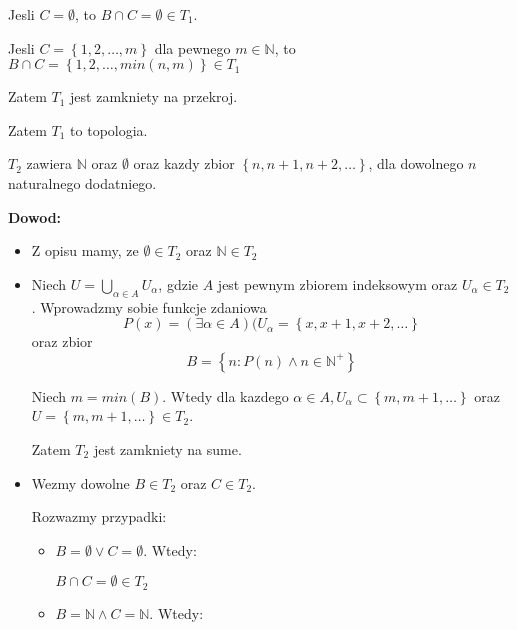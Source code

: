 \documentclass{article}
\begin{document}
\begin{enumerate}
\begin{itemize}
\begin{itemize}
\begin{itemize}
Jesli $C = \emptyset$, to $B\cap C = \emptyset \in T_{1}$.

Jesli $C = \left\{1,2,\dots,m\right\}$ dla pewnego $m \in \mathbb{N}$, to $B\cap C = \left\{1,2,\dots,min(n,m)\right\} \in T_{1}$  

\end{itemize}%
\end{itemize}%
Zatem $T_{1}$ jest zamkniety na przekroj.

Zatem $T_{1}$ to topologia.
\end{itemize}%

\begin{tcolorbox}[colback=white!90!red,colframe=black!35!red,title=Definicja:\textbf{Final segment topology}; poki co brak polskiego tlumaczenia]
$T_{2}$ zawiera $\mathbb{N}$ oraz $\emptyset$ oraz kazdy zbior $\left\{n, n+1, n+2,\dots \right\}$, dla dowolnego $n$ naturalnego dodatniego.
\end{tcolorbox}
\textbf{Dowod:}

\begin{itemize}%
    
\item Z opisu mamy, ze $\emptyset \in T_{2}$ oraz $\mathbb{N} \in T_{2}$
\item Niech $U = \bigcup\limits_{\alpha \in A}U_{\alpha}$, gdzie $A$ jest pewnym zbiorem indeksowym oraz $U_{\alpha} \in T_{2}$. Wprowadzmy sobie funkcje zdaniowa
$$P(x) = (\exists \alpha \in A)(U_{\alpha} = \left\{x, x+1, x+2, \dots\right\}$$
oraz zbior
$$B = \left\{n: P(n) \land n \in {\mathbb{N}}^{+}\right\}$$

Niech $m = min(B)$. Wtedy dla kazdego $\alpha \in A, U_{\alpha} \subset \left\{m, m+1, \dots\right\}$ oraz $U = \left\{m, m+1, \dots\right\} \in T_{2}$.

Zatem $T_{2}$ jest zamkniety na sume.

\item Wezmy dowolne $B \in T_{2}$ oraz $C \in T_{2}$.

Rozwazmy przypadki:

\begin{itemize}%
    
\item $B = \emptyset \lor C = \emptyset$. Wtedy:

$B\cap C = \emptyset \in T_{2}$
\item $B = \mathbb{N} \land C = \mathbb{N}$. Wtedy:


\end{itemize}
\end{itemize}
\end{enumerate}
\end{document}
